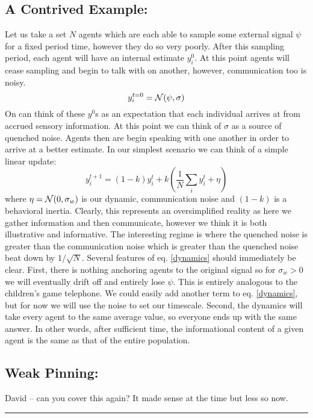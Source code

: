 \documentclass{article}
\newcommand{\N}{{\cal N}}
\newcommand{\be}{\begin{equation}}
\newcommand{\ee}{\end{equation}}
\newcommand{\lp}{\left(}
\newcommand{\rp}{\right)}
\begin{document}
\subsection*{A Contrived Example:}
Let us take a set $N$ agents which are each able to sample some external signal $\psi$ for a fixed period time, however they do so very poorly.  After this sampling period, each agent will have an internal estimate $y_i^0$.  At this point agents will cease sampling and begin to talk with on another, however, communication too is noisy.
\be
y_{i}^{t=0} = \N(\psi,\sigma)
\ee
On can think of these $y^0$s as an expectation that each individual arrives at from accrued sensory information.  At this point we can think of $\sigma$ as a source of quenched noise.  Agents then are begin speaking with one another in order to arrive at a better estimate.  In our simplest scenario we can think of a simple linear update:
\be
\label{dynamics}
y_{i}^{t+1} = (1-k)y_i^t + k\lp \frac{1}{N}\sum_{i}{y_{i}^{t}} + \eta \rp
\ee
where $\eta = \N(0,\sigma_{w})$ is our dynamic, communication noise and $(1-k)$ is a behavioral inertia.  Clearly, this represents an oversimplified reality as here we gather information and then communicate, however we think it is both illustrative and informative.  The interesting regime is where the quenched noise is greater than the communication noise which is greater than the quenched noise beat down by $1/\sqrt{N}$.  Several features of eq. \ref{dynamics} should immediately be clear.  First, there is nothing anchoring agents to the original signal so for $\sigma_{w} > 0$ we will eventually drift off and entirely lose $\psi$.  This is entirely analogous to the children's game telephone.   We could easily add another term to eq. \ref{dynamics}, but for now we will use the noise to set our timescale.  Second, the dynamics will take every agent to the same average value, so everyone ends up with the same answer.  In other words, after sufficient time, the informational content of a given agent is the same as that of the entire population.


\subsection*{Weak Pinning:}
David -- can you cover this again?  It made sense at the time but less so now.

\vspace{10pt}
\hrule

\vspace{15pt}
\end{document}
